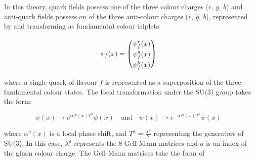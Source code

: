 \documentclass[12pt,a4paper,epsf,portrait,times,epsfig]{report}
\begin{document}
	In this theory, quark fields possess one of the three colour charges ($r$, $g$, $b$) and anti-quark fields possess on of the three anti-colour charges ($\overline{r}$, $\overline{g}$, $\overline{b}$), represented by and transforming as fundamental colour triplets:
	
	\begin{equation}
		\psi_{f}(x) = \begin{pmatrix}
			\psi_{f}^{r}(x) \rule{0pt}{2.6ex}\rule[-0.9ex]{0pt}{0pt}\\
			\psi_{f}^{g}(x) \rule{0pt}{2.6ex}\rule[-0.9ex]{0pt}{0pt}\\
			\psi_{f}^{b}(x) \rule{0pt}{2.6ex}\rule[-0.9ex]{0pt}{0pt}\\
		\end{pmatrix}
	\end{equation}	
	
	where a single quark of flavour $f$ is represented as a superposition of the three fundamental colour states. The local transformation under the SU(3) group takes the form:
	
	\begin{equation}
		\psi(x) \rightarrow e^{i\alpha^{a}(x)T^{a}}\psi(x)
		\quad \mathrm{and} \quad
		\overline{\psi}(x) \rightarrow e^{-i\alpha^{a}(x)T^{a}}\overline{\psi}(x)
	\end{equation}

	where $\alpha^{a}(x)$ is a local phase shift, and $T^{a} = \frac{\lambda^{a}}{2}$ representing the generators of SU(3). In this case, $\lambda^{a}$ represents the 8 Gell-Mann matrices and $a$ is an index of the gluon colour charge. The Gell-Mann matrices take the form of
	
\end{document}
